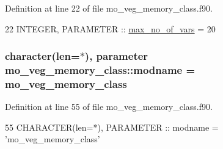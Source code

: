 Definition at line 22 of file mo\+\_\+veg\+\_\+memory\+\_\+class.\+f90.


\begin{DoxyCode}
22   \textcolor{keywordtype}{INTEGER}, \textcolor{keywordtype}{PARAMETER} :: \hyperlink{namespacemo__atmland__memory__class_afae3263e73e4c64ed0955c7ac81cd609}{max\_no\_of\_vars} = 20
\end{DoxyCode}
\hypertarget{namespacemo__veg__memory__class_a636c20bbb0af5d76979ff7931ab402d2}{}
\subsubsection[{modname}]{\setlength{\rightskip}{0pt plus 5cm}character(len=$\ast$), parameter mo\+\_\+veg\+\_\+memory\+\_\+class\+::modname = \textquotesingle{}mo\+\_\+veg\+\_\+memory\+\_\+class\textquotesingle{}}\label{namespacemo__veg__memory__class_a636c20bbb0af5d76979ff7931ab402d2}


Definition at line 55 of file mo\+\_\+veg\+\_\+memory\+\_\+class.\+f90.


\begin{DoxyCode}
55   \textcolor{keywordtype}{CHARACTER(len=*)}, \textcolor{keywordtype}{PARAMETER} :: modname = \textcolor{stringliteral}{'mo\_veg\_memory\_class'}
\end{DoxyCode}
